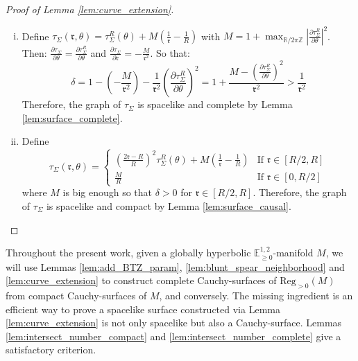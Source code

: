 \documentclass[a4paper,12pt]{article}
\def\r{\mathfrak{r}}
\def\Z{\mathbb{Z}}
\def\R{\mathbb{R}}
\newcommand{\mass}[1]{{\mathbb E}^{1,2}_{#1}}
\def\Reg{\mathrm{Reg}}
\def\reg{\Reg}
\begin{document}
      \begin{proof}[Proof of Lemma \ref{lem:curve_extension}]
      	  \begin{enumerate}[(i)]
	   \item Define $\displaystyle\tau_\Sigma (\r,\theta)= \tau_\Sigma^R(\theta)+M\left(\frac{1}{\r}-\frac{1}{R}\right)$
		 with $\displaystyle M=1+\max_{ \R/2\pi\Z}\left| \frac{\partial \tau_\Sigma^R}{\partial \theta}\right|^2$.
		 \\Then: $ \frac{\partial \tau_\Sigma}{\partial \theta} = \frac{\partial \tau_\Sigma^R}{\partial \theta}$ and 
		 $\frac{\partial \tau_\Sigma}{\partial \r} = -\frac{M}{ \r^2}$. 
		 So that: 
		 $$
		 \delta=1-\left(-\frac{M}{ \r^2} \right) -\frac{1}{\r^2}\left(\frac{\partial \tau_\Sigma^R}{\partial \theta} \right)^2
		 =1+ \frac{M-\left(\frac{\partial \tau_\Sigma^R}{\partial \theta} \right)^2}{\r^2}
		 >\frac{1}{\r^2}
		 $$
		  Therefore, the graph  of $\tau_\Sigma$ is spacelike and complete  by Lemma \ref{lem:surface_complete}.
		  
	  \item Define $$\tau_\Sigma(\r,\theta)=\left\{\begin{array}{ll}
	                                               \left(\frac{2\r-R}{R}\right)^2\tau^R_\Sigma(\theta)+M\left(\frac{1}{\r}-\frac{1}{R}\right)& \text{If } \r\in [R/2,R] \\
	                                               \frac{M}{R}& \text{If } \r\in[0,R/2]
	                                              \end{array}
	                                              \right.$$
	        where $M$ is big enough so that $\delta>0$ for  $\r\in[R/2,R]$.
	       Therefore, the graph  of $\tau_\Sigma$ is spacelike and compact by Lemma \ref{lem:surface_causal}.
	  \end{enumerate}
       
      \end{proof}

    Throughout the present work, given a globally hyperbolic $\mass{\geq0}$-manifold $M$, we will use Lemmas \ref{lem:add_BTZ_param}, \ref{lem:blunt_spear_neighborhood} and \ref{lem:curve_extension} to construct complete Cauchy-surfaces of $\reg_{>0}(M)$ from compact Cauchy-surfaces of $M$, and conversely. The missing ingredient is an efficient way to prove a spacelike surface constructed via Lemma  \ref{lem:curve_extension} is not only spacelike but also a Cauchy-surface. Lemmas \ref{lem:intersect_number_compact} and \ref{lem:intersect_number_complete} give a satisfactory criterion.
    
\end{document}
